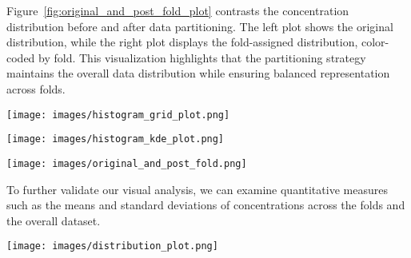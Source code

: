 Figure~\ref{fig:original_and_post_fold_plot} contrasts the  concentration distribution before and after data partitioning.
The left plot shows the original distribution, while the right plot displays the fold-assigned distribution, color-coded by fold.
This visualization highlights that the partitioning strategy maintains the overall data distribution while ensuring balanced representation across folds.

\begin{figure*}[h!]
    \centering
    \texttt{[image: images/histogram\_grid\_plot.png]}
    \caption{Histogram and \gls{kde} of  distribution in each fold. The y-axis represents the count of samples per bin, and the x-axis represents  concentration. The notation in the legend indicates the amount of instances in the training/validation sets.}
    \label{fig:histogram_grid_plot}
\end{figure*}

\begin{figure*}[h!]
    \centering
    \texttt{[image: images/histogram\_kde\_plot.png]}
    \caption{Combined Histogram and \gls{kde} of  distribution in each fold. The y-axis represents the count of samples per bin, and the x-axis represents  concentration. The notation in the legend indicates the amount of instances in the training/validation sets.}
    \label{fig:histogram_kde_plot}
\end{figure*}

\begin{figure*}[h!]
    \centering
    \texttt{[image: images/original\_and\_post\_fold.png]}
    \caption{Distribution of  concentrations before and after fold assignment. The left plot shows the original distribution of , while the right plot shows the distribution with folds assigned, color-coded to indicate the different folds.}
    \label{fig:original_and_post_fold_plot}
\end{figure*}


To further validate our visual analysis, we can examine quantitative measures such as the means and standard deviations of  concentrations across the folds and the overall dataset.

\begin{figure*}[htbp]
    \centering
    \texttt{[image: images/distribution\_plot.png]}
    \caption{Distribution of  concentrations across cross-validation folds, training set, test set, and the entire dataset. The mean and standard deviation statistics for each partition are indicated figure.}
    \label{fig:siO2_distribution}
\end{figure*}

